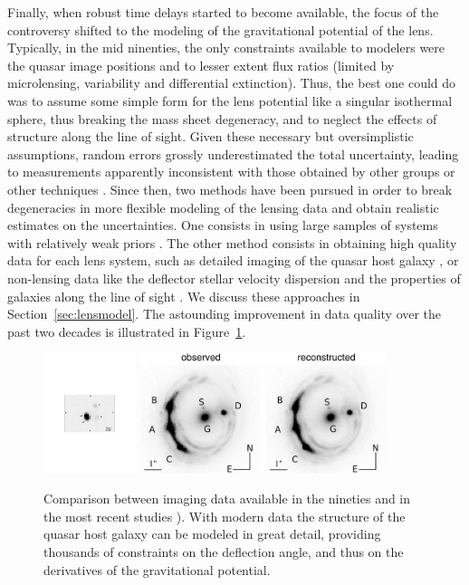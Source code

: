 Finally, when robust time delays started to become available, the
focus of the controversy shifted to the modeling of the gravitational
potential of the lens. Typically, in the mid ninenties, the only
constraints available to modelers were the quasar image positions and
to lesser extent flux ratios (limited by microlensing, variability and
differential extinction). Thus, the best one could do was to assume
some simple form for the lens potential like a singular isothermal
sphere, thus breaking the mass sheet degeneracy, and to neglect the
effects of structure along the line of sight. Given these necessary
but oversimplistic assumptions, random errors grossly underestimated
the total uncertainty, leading to measurements apparently inconsistent
with those obtained by other groups or other techniques
\citep{K+S04}. Since then, two methods have been pursued in order to
break degeneracies in more flexible modeling of the lensing data and
obtain realistic estimates on the uncertainties. One consists in using
large samples of systems with relatively weak priors
\citep{Ogu07b}. The other method consists in obtaining high quality data for
each lens system, such as detailed imaging of the quasar host galaxy
\citep{Keeton:2000p241,WBB04,Suy++06}, or non-lensing data like the deflector
stellar velocity dispersion \citep{T+K02b} and the properties of
galaxies along the line of sight \citep{K+Z04,Suy++10}. We discuss
these approaches in Section~\ref{sec:lensmodel}. The astounding
improvement in data quality over the past two decades is illustrated
in Figure~\ref{fig:oldvsmodernimage}.

\begin{figure}
\includegraphics[height=3.5cm]{figures/Schechter97_fg1.pdf}
\includegraphics[height=3.5cm]{figures/Suyu14_fig1.jpg}
\caption{Comparison between imaging data available in the nineties \citep[eft panel, from][]{Sch++97} and in the most recent studies \citep[middle and right panels, from][]{Suy++14}). With modern data the structure of the quasar host galaxy can be modeled in great detail, providing thousands of constraints on the deflection angle, and thus on the derivatives of the gravitational potential.}
\label{fig:oldvsmodernimage}
\end{figure}

